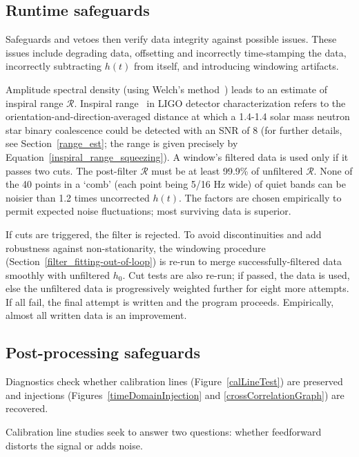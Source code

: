 \subsection{Runtime safeguards}
    \label{runtimeSafeguards}


Safeguards and vetoes then verify data integrity against possible issues. These issues include degrading data, offsetting and incorrectly time-stamping the data, incorrectly subtracting $h(t)$ from itself, and introducing windowing artifacts.

Amplitude spectral density (using Welch's method~\cite{Welch1967}) leads to an estimate of inspiral range $\mathcal{R}$. Inspiral range~\cite{FinnInspiral1993} in LIGO detector characterization refers to the orientation-and-direction-averaged distance at which a 1.4-1.4 solar mass neutron star binary coalescence could be detected with an SNR of 8 (for further details, see Section~\ref{range_est}; the range is given precisely by Equation~\ref{inspiral_range_squeezing}). A window's filtered data is used only if it passes two cuts. The post-filter $\mathcal{R}$ must be at least 99.9\% of unfiltered $\mathcal{R}$. None of the 40 points in a `comb' (each point being 5/16 Hz wide) of quiet bands can be noisier than 1.2 times uncorrected $h(t)$. The factors are chosen empirically to permit expected noise fluctuations; most surviving data is superior.  

If cuts are triggered, the filter is rejected. To avoid discontinuities and add robustness against non-stationarity, the windowing procedure (Section~\ref{filter_fitting-out-of-loop}) is re-run to merge successfully-filtered data smoothly with unfiltered $h_0$. Cut tests are also re-run; if passed, the data is used, else the unfiltered data is progressively weighted further for eight more attempts. If all fail, the final attempt is written and the program proceeds. Empirically, almost all written data is an improvement.

    \subsection{Post-processing safeguards}
    \label{postprocessingSafeguards}

Diagnostics check whether 
calibration lines (Figure~\ref{calLineTest}) are preserved
and 
injections (Figures~\ref{timeDomainInjection} and \ref{crossCorrelationGraph}) are recovered.

Calibration line studies seek to answer two questions: whether feedforward distorts the signal or adds noise. 

